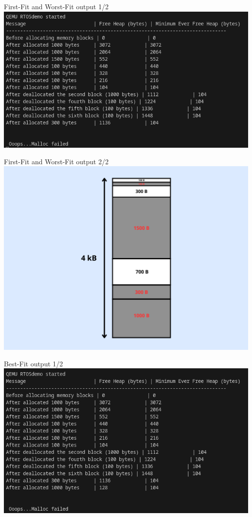 \documentclass{beamer}
\begin{document}
\begin{frame}{First-Fit and Worst-Fit output 1/2}
   \vfill
    \centering
    \includegraphics[width=0.8\linewidth]{img/first-worst-fit_output.png} 
    \vfill 
\end{frame}

\begin{frame}{First-Fit and Worst-Fit output 2/2}
   \vfill
    \centering
    \includegraphics[width=0.65\linewidth]{img/first-worst.png} 
    \vfill 
\end{frame}

\begin{frame}{Best-Fit output 1/2}
    \vfill
    \centering
    \includegraphics[width=0.8\linewidth]{img/best-fit_output.png} 
    \vfill 
\end{frame}
\end{document}
